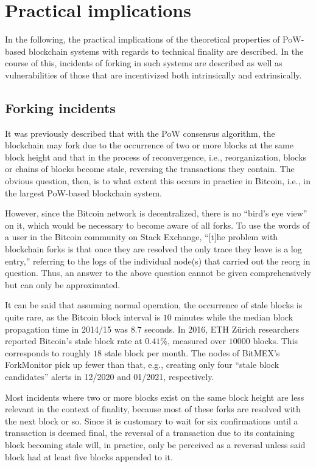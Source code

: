 \section{Practical implications}

In the following, the practical implications of the theoretical properties of PoW-based blockchain systems with regards to technical finality are described.
In the course of this, incidents of forking in such systems are described as well as vulnerabilities of those that are incentivized both intrinsically and extrinsically.

\subsection{Forking incidents}

It was previously described that with the PoW consensus algorithm, the blockchain may fork due to the occurrence of two or more blocks at the same block height and that in the process of reconvergence, i.e., reorganization, blocks or chains of blocks become stale, reversing the transactions they contain.
The obvious question, then, is to what extent this occurs in practice in Bitcoin, i.e., in the largest PoW-based blockchain system.

However, since the Bitcoin network is decentralized, there is no ``bird's eye view'' on it, which would be necessary to become aware of all forks.
To use the words of a user in the Bitcoin community on Stack Exchange, ``[t]he problem with blockchain forks is that once they are resolved the only trace they leave is a log entry,'' \autocite{sebitcoin2012longestfork} referring to the logs of the individual node(s) that carried out the reorg in question.
Thus, an answer to the above question cannot be given comprehensively but can only be approximated.

It can be said that assuming normal operation, the occurrence of stale blocks is quite rare, as the Bitcoin block interval is \(10\) minutes while the median block propagation time in 2014/15 was \(8.7\) seconds. \autocite[7]{croman2016}
In 2016, ETH Zürich researchers reported Bitcoin's stale block rate at \(0.41\%\), measured over \(10000\) blocks. \autocite[3]{gervais2016}
This corresponds to roughly \(18\) stale block per month.
The nodes of BitMEX's ForkMonitor pick up fewer than that, e.g., creating only four ``stale block candidates'' alerts in 12/2020 and 01/2021, respectively. \autocite{bitmex2021}

Most incidents where two or more blocks exist on the same block height are less relevant in the context of finality, because most of these forks are resolved with the next block or so.
Since it is customary to wait for six confirmations until a transaction is deemed final, the reversal of a transaction due to its containing block becoming stale will, in practice, only be perceived as a reversal unless said block had at least five blocks appended to it.

